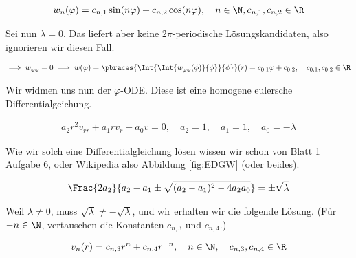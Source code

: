 \begin{solution}
\begin{enumerate}[label = (\roman*)]
    \begin{align*}
        w_n(\varphi)
        =
        c_{n, 1} \sin(n \varphi)
        +
        c_{n, 2} \cos(n \varphi),
        \quad
        n \in \N,
        c_{n, 1}, c_{n, 2} \in \R
    \end{align*}

    Sei nun $\lambda = 0$.
    Das liefert aber keine $2 \pi$-periodische Lösungskandidaten, also ignorieren wir diesen Fall.

    \begin{align*}
        \implies
        w_{\varphi \varphi} = 0
        \implies
        w(\varphi)
        =
        \pbraces
        {
            \Int
            {
                \Int
                {
                    w_{\varphi \varphi}(\phi)
                }{\phi}
            }{\phi}            
        }(r)
        =
        c_{0, 1} \varphi + c_{0, 2},
        \quad
        c_{0, 1}, c_{0, 2} \in \R
    \end{align*}

    Wir widmen uns nun der $\varphi$-ODE.
    Diese ist eine homogene eulersche Differentialgeichung.

    \begin{align*}
        a_2 r^2 v_{rr}
        +
        a_1 r v_r
        +
        a_0 v = 0,
        \quad
        a_2 = 1, \quad a_1 = 1, \quad a_0 = -\lambda
    \end{align*}

    Wie wir solch eine Differentialgleichung lösen wissen wir schon von Blatt 1 Aufgabe 6, oder Wikipedia also Abbildung \ref{fig:EDGW} (oder beides).

    \begin{align*}
        \Frac
        {2 a_2}
        {
            a_2 - a_1
            \pm
            \sqrt
            {
                (a_2 - a_1)^2
                -
                4 a_2 a_0
            }
        }
        =
        \pm \sqrt{\lambda}  
    \end{align*}

    Weil $\lambda \neq 0$, muss $\sqrt{\lambda} \neq -\sqrt{\lambda}$, und wir erhalten wir die folgende Lösung.
    (Für $-n \in \N$, vertauschen die Konstanten $c_{n, 3}$ und $c_{n, 4}$.)

    \begin{align*}
        v_n(r)
        =
        c_{n, 3} r^n + c_{n, 4} r^{-n},
        \quad
        n \in \N,
        \quad
        c_{n, 3}, c_{n, 4} \in \R
    \end{align*}


\end{enumerate}
\end{solution}
